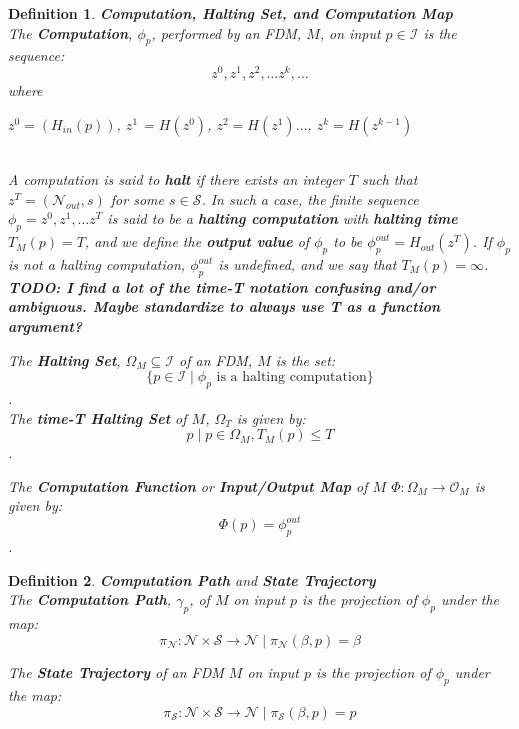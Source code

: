 \documentclass[twoside]{article}
\newcommand{\todo}[1]{
  \LARGE
  \textbf{TODO: #1}
  \normalsize
}
\newcommand{\set}[1]{\{#1\}}
\newcommand{\functype}[3]{$#1:#2 \rightarrow #3$}
\newcommand{\mfunctype}[3]{#1:#2 \rightarrow #3}
\newcommand{\inspace}[0]{\mathcal{I}}
\newcommand{\outspace}[0]{\mathcal{O}}
\newcommand{\statespace}[0]{\mathcal{S}}
\newcommand{\nodes}[0]{\mathcal{N}}
\newcommand{\fullstate}[0]{\nodes \times \statespace}
\newcommand{\nodeout}[0]{\nodes_{out}}
\newcommand{\computefn}[0]{\Phi}
\newcommand{\compute}[0]{\phi}
\newcommand{\computeout}[1]{\phi_{#1}^{out}}
\newcommand{\halting}[0]{\Omega}
\newcommand{\computepath}[0]{\gamma}
\newcommand{\pathprojection}[0]{\pi_\nodes}
\newcommand{\stateprojection}[0]{\pi_\statespace}
\newtheorem{definition}{Definition}[section]
\begin{document}
\begin{definition}{\textbf{Computation, Halting Set, and Computation Map}}\\
  
  The \textbf{Computation}, $\compute_p$, performed by an FDM, $M$,
  on input $p \in \inspace$ is the sequence: 
  $$z^0, z^1, z^2, \ldots z^k, \ldots$$ 
  where\\ 
  \centerline{$z^0 = (H_{in}(p))$, $z^1$ = $H(z^0)$, $z^2 = H(z^1) \ldots$, $z^k = H(z^{k-1})$}\\

  A computation is said to \textbf{halt} if there exists an integer
  $T$ such that $z^T = (\nodeout, s)$ for some $s \in \statespace$.
  In such a case, the finite sequence $\compute_p = z^0, z^1, \ldots
  z^T$ is said to be a \textbf{halting computation} with
  \textbf{halting time} $T_M(p) = T$, and we define the \textbf{output
    value} of $\compute_p$ to be $\computeout{p} = H_{out}(z^T)$.  If
  $\compute_p$ is not a halting computation, $\computeout{p}$ is
  undefined, and we say that $T_M(p) = \infty$.\\
  
  \todo{I find a lot of the time-T notation confusing and/or
    ambiguous. Maybe standardize to always use T as a function
    argument?}

  The \textbf{Halting Set}, $\halting_M \subseteq \inspace$ of an FDM,
  $M$ is the set: 
  $$\set{p \in \inspace \mid \compute_p \text{ is a halting computation}}$$.\\
  \noindent The \textbf{time-T Halting Set} of $M$, $\halting_T$ is given by:
  $$p \mid p \in \halting_M, T_M(p) \leq T$$.
  
  The \textbf{Computation Function} or \textbf{Input/Output Map} of
  $M$ \functype{\computefn}{\halting_M}{\outspace_M} is given by:
  $$\computefn(p) = \computeout{p}$$.
\end{definition}
\begin{definition}{\textbf{Computation Path} and \textbf{State Trajectory}}\\
  
  The \textbf{Computation Path}, $\computepath_p$, of $M$ on
  input $p$ is the projection of $\compute_p$ under the map:
  $$\mfunctype{\pathprojection}{\fullstate}{\nodes} \mid \pathprojection(\beta, p) = \beta$$
  
  The \textbf{State Trajectory} of an FDM $M$ on input $p$ is the
  projection of $\compute_p$ under the map:
  $$\mfunctype{\stateprojection}{\fullstate}{\nodes} \mid \stateprojection(\beta, p) = p$$
\end{definition}
\end{document}
